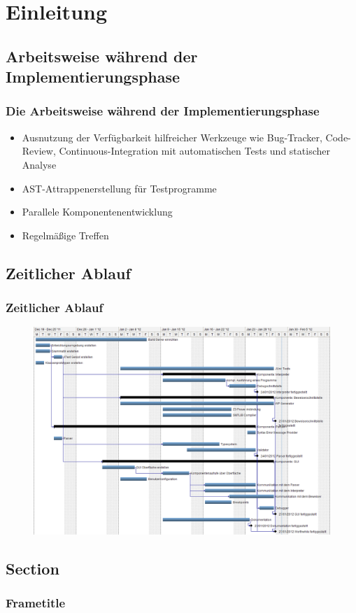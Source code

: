 \section{Einleitung}

\subsection{Arbeitsweise während der Implementierungsphase}
\begin{frame}
\frametitle{Die Arbeitsweise während der Implementierungsphase}

\begin{itemize}
	\item<+-> Ausnutzung der Verfügbarkeit hilfreicher Werkzeuge wie Bug-Tracker, Code-Review, Continuous-Integration mit automatischen Tests und statischer Analyse
	\item<+-> AST-Attrappenerstellung für Testprogramme
	\item<+-> Parallele Komponentenentwicklung
	\item<+-> Regelmäßige Treffen
\end{itemize}
\end{frame}

\subsection{Zeitlicher Ablauf}
\begin{frame}
\frametitle{Zeitlicher Ablauf}

\begin{figure}
	\vspace{-0.15cm}
	\includegraphics[height=0.95\textheight]{../bericht/images/gantt_implementierung_diag.png}
\end{figure}
\end{frame}

\subsection{Section}
\begin{frame}
\frametitle{Frametitle}

\end{frame}
